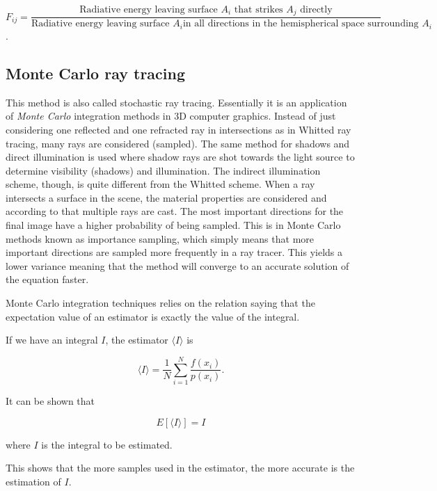 \documentclass[a4paper]{report}
\begin{document}
\begin{equation}
  F_{ij} = \frac{\text{Radiative energy leaving surface } A_i \text{ that
    strikes } A_j \text{ directly}}{\text{Radiative energy leaving
    surface } A_i \text{in all directions in the hemispherical space
    surrounding } A_i}
\end{equation}.

\subsection{Monte Carlo ray tracing}

This method is also called stochastic ray tracing. Essentially it is
an application of \emph{Monte Carlo} integration methods in 3D computer
graphics. Instead of just considering one reflected and one refracted
ray in intersections as in Whitted ray tracing, many
rays are considered (sampled). The same method for shadows and direct
illumination is used where shadow rays are shot towards the
light source to determine visibility (shadows) and illumination. The
indirect illumination scheme, though, is quite different from the Whitted
scheme. When a ray intersects a surface in the scene, the
material properties are considered and according to that multiple rays
are cast. The most important directions for the final image have a
higher probability of being sampled. This is in Monte Carlo methods
known as importance sampling, which simply means that more important
directions are sampled more frequently in a ray tracer. This yields a
lower variance meaning that the method will converge to an accurate
solution of the equation faster.

Monte Carlo integration techniques relies on the relation saying that the expectation value
of an estimator is exactly the value of the integral.

If we have an integral \(I\), the estimator \(\langle I \rangle\) is

\begin{equation}
  \langle I \rangle = \frac{1}{N}\sum^N_{i=1}\frac{f(x_i)}{p(x_i)}.
  \label{eq:estimator}
\end{equation}

It can be shown that

\begin{equation}
  E[\langle I \rangle] = I
\end{equation}

where \(I\) is the integral to be estimated.

This shows that the more samples used in the estimator, the more
accurate is the estimation of \(I\).
\end{document}
